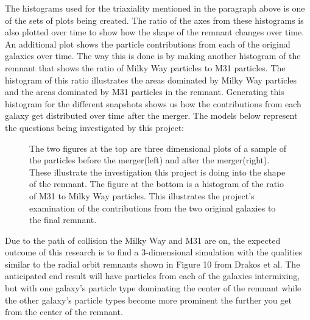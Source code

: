 \documentclass[linenumbers,trackchanges]{aastex7}
\begin{document}
The histograms used for the triaxiality mentioned in the paragraph above is one of the sets of plots being created. The ratio of the axes from these histograms is also plotted over time to show how the shape of the remnant changes over time. An additional plot shows the particle contributions from each of the original galaxies over time. The way this is done is by making another histogram of the remnant that shows the ratio of Milky Way particles to M31 particles. The histogram of this ratio illustrates the areas dominated by Milky Way particles and the areas dominated by M31 particles in the remnant. Generating this histogram for the different snapshots shows us how the contributions from each galaxy get distributed over time after the merger. 
The models below represent the questions being investigated by this project:
\begin{figure}[ht!]
\caption{The two figures at the top are three dimensional plots of a sample of the particles before the merger(left) and after the merger(right). These illustrate the investigation this project is doing into the shape of the remnant. The figure at the bottom is a histogram of the ratio of M31 to Milky Way particles. This illustrates the project's examination of the contributions from the two original galaxies to the final remnant.
\label{fig:general}}
\end{figure}

Due to the path of collision the Milky Way and M31 are on, the expected outcome of this research is to find a 3-dimensional simulation with the qualities similar to the radial orbit remnants shown in Figure 10 from Drakos et al. The anticipated end result will have particles from each of the galaxies intermixing, but with one galaxy’s particle type dominating the center of the remnant while the other galaxy's particle types become more prominent the further you get from the center of the remnant. 


{}



\end{document}

